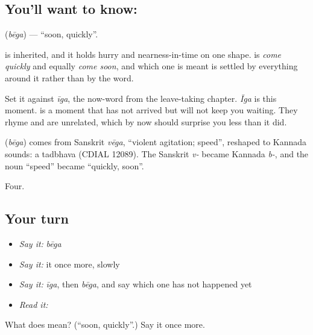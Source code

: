 \subsection*{You'll want to know: }
\textbf{} (\emph{bēga}) — \textquotedblleft{}soon, quickly\textquotedblright{}.

 is inherited, and it holds hurry and nearness-in-time on one shape.   is \emph{come quickly} and equally \emph{come soon}, and which one is meant is settled by everything around it rather than by the word.

Set it against \emph{īga}, the now-word from the leave-taking chapter. \emph{Īga} is this moment.  is a moment that has not arrived but will not keep you waiting. They rhyme and are unrelated, which by now should surprise you less than it did.

\begin{cousinweb}
\textbf{} (\emph{bēga}) comes from Sanskrit \emph{vēga}, \textquotedblleft{}violent agitation; speed\textquotedblright{}, reshaped to Kannada sounds: a tadbhava (CDIAL 12089). The Sanskrit \emph{v-} became Kannada \emph{b-}, and the noun \textquotedblleft{}speed\textquotedblright{} became \textquotedblleft{}quickly, soon\textquotedblright{}.
\end{cousinweb}

\begin{grammarlens}[title={What you've built}]
Four.
\end{grammarlens}

\subsection*{Your turn}
\begin{itemize}
\raggedright
  \item \emph{Say it:} \emph{bēga}
  \item \emph{Say it:} it once more, slowly
  \item \emph{Say it:} \emph{īga}, then \emph{bēga}, and say which one has not happened yet
  \item \emph{Read it:} \textbf{}
\end{itemize}

\begin{tcolorbox}[breakable,colback=teal!4,colframe=teal!35!black,title={Before you move on}]
What does  mean? (\textquotedblleft{}soon, quickly\textquotedblright{}.) Say it once more.
\end{tcolorbox}
